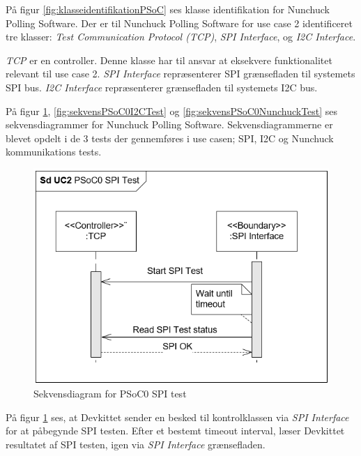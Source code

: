På figur \ref{fig:klasseidentifikationPSoC} ses klasse identifikation for Nunchuck Polling Software. Der er til Nunchuck Polling Software for use case 2 identificeret tre klasser: \textit{Test Communication Protocol (TCP)}, \textit{SPI Interface}, og \textit{I2C Interface}.

\textit{TCP} er en controller. Denne klasse har til ansvar at eksekvere funktionalitet relevant til use case 2. \textit{SPI Interface} repræsenterer SPI grænsefladen til systemets SPI bus. \textit{I2C Interface} repræsenterer grænsefladen til systemets I2C bus.

På figur \ref{fig:sekvensPSoC0SPITest}, \ref{fig:sekvensPSoC0I2CTest} og \ref{fig:sekvensPSoC0NunchuckTest} ses sekvensdiagrammer for Nunchuck Polling Software. Sekvensdiagrammerne er blevet opdelt i de 3 tests der gennemføres i use casen; SPI, I2C og Nunchuck kommunikations tests.

\begin{figure}[H]
	\centering
	\includegraphics[width=.8\textwidth] {Systemarkitektur/images/SDPSoC0SPITest}
	\caption{Sekvensdiagram for PSoC0 SPI test}
	\label{fig:sekvensPSoC0SPITest}
\end{figure}

På figur \ref{fig:sekvensPSoC0SPITest} ses, at Devkittet sender en besked til kontrolklassen via \textit{SPI Interface} for at påbegynde SPI testen. Efter et bestemt timeout interval, læser Devkittet resultatet af SPI testen, igen via \textit{SPI Interface} grænsefladen.

